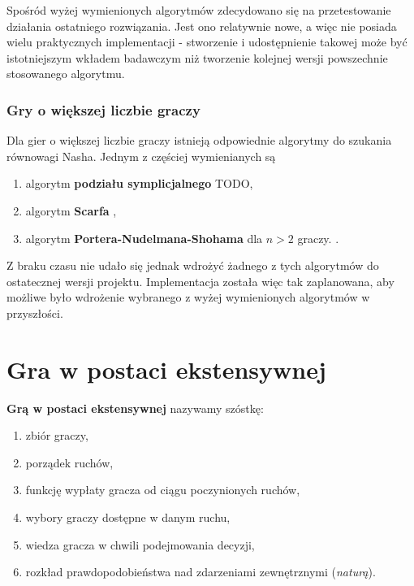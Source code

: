 \documentclass[polish]{standalone}
\begin{document}
Spośród wyżej wymienionych algorytmów zdecydowano się na przetestowanie działania ostatniego rozwiązania. Jest ono
relatywnie nowe, a więc nie posiada wielu praktycznych implementacji - stworzenie i udostępnienie takowej może być
istotniejszym wkładem badawczym niż tworzenie kolejnej wersji powszechnie stosowanego algorytmu.

\subsubsection{Gry o większej liczbie graczy}

Dla gier o większej liczbie graczy istnieją odpowiednie algorytmy do szukania równowagi Nasha. Jednym z częściej
wymienianych są
\begin{enumerate}
\item algorytm \textbf{podziału symplicjalnego} TODO,
\item algorytm \textbf{Scarfa} \cite{SCARF-NR},
\item algorytm \textbf{Portera-Nudelmana-Shohama} dla $n > 2$ graczy. \cite{PNS-NE}.
\end{enumerate}

Z braku czasu nie udało się jednak wdrożyć żadnego z tych algorytmów do ostatecznej wersji projektu. Implementacja
została więc tak zaplanowana, aby możliwe było wdrożenie wybranego z wyżej wymienionych algorytmów w przyszłości.

\section{Gra w postaci ekstensywnej}

\begin{definition}
\textbf{Grą w postaci ekstensywnej} nazywamy szóstkę:
\begin{enumerate}
\item zbiór graczy,
\item porządek ruchów,
\item funkcję wypłaty gracza od ciągu poczynionych ruchów,
\item wybory graczy dostępne w danym ruchu,
\item wiedza gracza w chwili podejmowania decyzji,
\item rozkład prawdopodobieństwa nad zdarzeniami zewnętrznymi (\textit{naturą}).
\end{enumerate}
\cite[str.~77--78]{FT-GT}
\end{definition}
\end{document}
